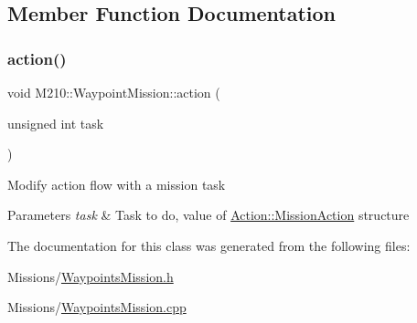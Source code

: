 \subsection{Member Function Documentation}
\mbox{\label{class_m210_1_1_waypoint_mission_ab4f5a1e359026ddcd640cda09501fd6b}} 
\subsubsection{\texorpdfstring{action()}{action()}}
{\footnotesize\ttfamily void M210\+::\+Waypoint\+Mission\+::action (\begin{DoxyParamCaption}\item[{unsigned int}]{task }\end{DoxyParamCaption})}

Modify action flow with a mission task 
\begin{DoxyParams}{Parameters}
{\em task} & Task to do, value of \mbox{\hyperlink{class_m210_1_1_action_a0bb36f0932c930e1193428e3c3c98046}{Action\+::\+Mission\+Action}} structure \\
\hline
\end{DoxyParams}


The documentation for this class was generated from the following files\+:\begin{DoxyCompactItemize}
\item 
Missions/\mbox{\hyperlink{_waypoints_mission_8h}{Waypoints\+Mission.\+h}}\item 
Missions/\mbox{\hyperlink{_waypoints_mission_8cpp}{Waypoints\+Mission.\+cpp}}\end{DoxyCompactItemize}

